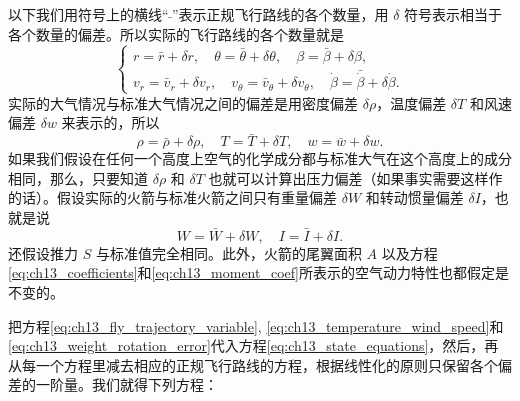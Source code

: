 以下我们用符号上的横线“$\bar{}$”表示正规飞行路线的各个数量，用 $\delta$ 符号表示相当于各个数量的偏差。所以实际的飞行路线的各个数量就是
\begin{equation}\label{eq:ch13_fly_trajectory_variable}
\begin{cases}
r = \bar{r} + \delta r, \quad \theta = \bar{\theta} + \delta \theta, \quad \beta = \bar{\beta} + \delta \beta,\\
v_r = \bar{v}_r + \delta v_r, \quad v_\theta = \bar{v}_\theta + \delta v_\theta, \quad \dot{\beta} = \bar{\dot{\beta}} + \delta \dot{\beta}.
\end{cases}
\end{equation}
实际的大气情况与标准大气情况之间的偏差是用密度偏差 $\delta \rho$，温度偏差 $\delta T$ 和风速偏差 $\delta w$ 来表示的，所以
\begin{equation}\label{eq:ch13_temperature_wind_speed}
\rho = \bar{\rho} + \delta \rho, \quad T = \bar{T} + \delta T, \quad w = \bar{w} + \delta w.
\end{equation}
如果我们假设在任何一个高度上空气的化学成分都与标准大气在这个高度上的成分相同，那么，只要知道 $\delta \rho$ 和 $\delta T$ 也就可以计算出压力偏差（如果事实需要这样作的话）。假设实际的火箭与标准火箭之间只有重量偏差 $\delta W$ 和转动惯量偏差 $\delta I$，也就是说
\begin{equation}\label{eq:ch13_weight_rotation_error}
W = \bar{W} + \delta W, \quad I = \bar{I} + \delta I.
\end{equation}
还假设推力 $S$ 与标准值完全相同。此外，火箭的尾翼面积 $A$ 以及方程\eqref{eq:ch13_coefficients}和\eqref{eq:ch13_moment_coef}所表示的空气动力特性也都假定是不变的。

把方程\eqref{eq:ch13_fly_trajectory_variable}, \eqref{eq:ch13_temperature_wind_speed}和\eqref{eq:ch13_weight_rotation_error}代入方程\eqref{eq:ch13_state_equations}，然后，再从每一个方程里减去相应的正规飞行路线的方程，根据线性化的原则只保留各个偏差的一阶量。我们就得下列方程：

